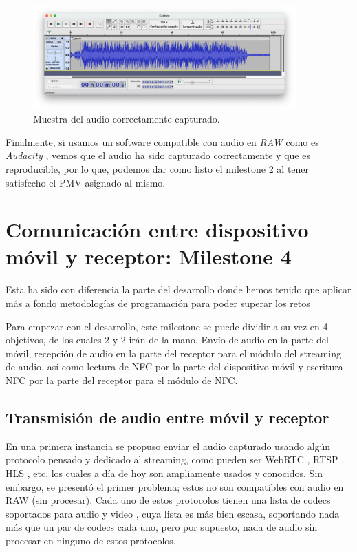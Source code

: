 \begin{figure}[h!]
    \centering
    \includegraphics[width=0.9\textwidth]{fotos/muestra_captura_audacity.png}
    \caption{Muestra del audio correctamente capturado.}
\end{figure}

Finalmente, si usamos un software compatible con audio en \emph{RAW} como es
\emph{Audacity} \cite{software-audacity}, vemos que el audio ha sido capturado
correctamente y que es reproducible, por lo que, podemos dar como listo el
milestone 2 al tener satisfecho el PMV asignado al mismo.

\section{Comunicación entre dispositivo móvil y receptor: Milestone 4}

Esta ha sido con diferencia la parte del desarrollo donde hemos tenido que
aplicar más a fondo metodologías de programación para poder superar los retos

Para empezar con el desarrollo, este milestone se puede dividir a su vez en 4
objetivos, de los cuales 2 y 2 irán de la mano. Envío de audio en la parte del
móvil, recepción de audio en la parte del receptor para el módulo del streaming
de audio, así como lectura de NFC por la parte del dispositivo móvil y escritura
NFC por la parte del receptor para el módulo de NFC.

\subsection{Transmisión de audio entre móvil y receptor}

En una primera instancia se propuso enviar el audio capturado usando algún
protocolo pensado y dedicado al streaming, como pueden ser WebRTC
\cite{protocolo-webrtc}, RTSP \cite{protocolo-rtsp}, HLS \cite{protocolo-hls},
etc. los cuales a día de hoy son ampliamente usados y conocidos. Sin embargo, se
presentó el primer problema; estos no son compatibles con audio en
\href{https://en.wikipedia.org/wiki/Raw_audio_format}{RAW} (sin procesar). Cada
uno de estos protocolos tienen una lista de codecs soportados para audio y
video \cite{protocolo-codecs}, cuya lista es más bien escasa, soportando nada más que un par de codecs
cada uno, pero por supuesto, nada de audio sin procesar en ninguno de estos
protocolos.\\


